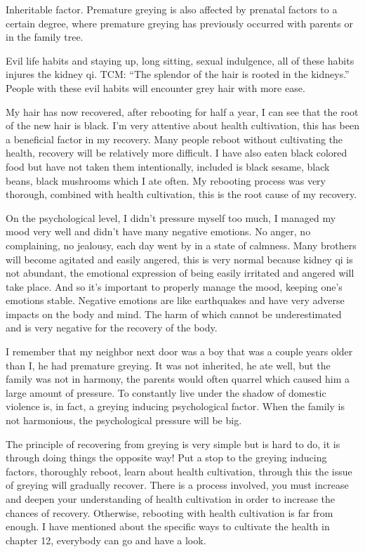\documentclass[
]{book}
\begin{document}
Inheritable factor. Premature greying is also affected by prenatal factors to a certain degree, where premature greying has previously occurred with parents or in the family tree.

Evil life habits and staying up, long sitting, sexual indulgence, all of these habits injures the kidney qi. TCM: ``The splendor of the hair is rooted in the kidneys.'' People with these evil habits will encounter grey hair with more ease.

My hair has now recovered, after rebooting for half a year, I can see that the root of the new hair is black. I'm very attentive about health cultivation, this has been a beneficial factor in my recovery. Many people reboot without cultivating the health, recovery will be relatively more difficult. I have also eaten black colored food but have not taken them intentionally, included is black sesame, black beans, black mushrooms which I ate often. My rebooting process was very thorough, combined with health cultivation, this is the root cause of my recovery.

On the psychological level, I didn't pressure myself too much, I managed my mood very well and didn't have many negative emotions. No anger, no complaining, no jealousy, each day went by in a state of calmness. Many brothers will become agitated and easily angered, this is very normal because kidney qi is not abundant, the emotional expression of being easily irritated and angered will take place. And so it's important to properly manage the mood, keeping one's emotions stable. Negative emotions are like earthquakes and have very adverse impacts on the body and mind. The harm of which cannot be underestimated and is very negative for the recovery of the body.

I remember that my neighbor next door was a boy that was a couple years older than I, he had premature greying. It was not inherited, he ate well, but the family was not in harmony, the parents would often quarrel which caused him a large amount of pressure. To constantly live under the shadow of domestic violence is, in fact, a greying inducing psychological factor. When the family is not harmonious, the psychological pressure will be big.

The principle of recovering from greying is very simple but is hard to do, it is through doing things the opposite way! Put a stop to the greying inducing factors, thoroughly reboot, learn about health cultivation, through this the issue of greying will gradually recover. There is a process involved, you must increase and deepen your understanding of health cultivation in order to increase the chances of recovery. Otherwise, rebooting with health cultivation is far from enough. I have mentioned about the specific ways to cultivate the health in chapter 12, everybody can go and have a look.
\end{document}

